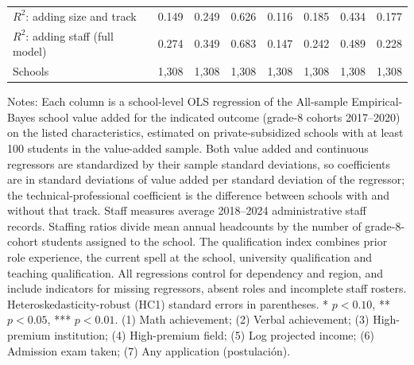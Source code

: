 \begin{table}[!htbp]
{\begin{tabular}{lccccccc}
$R^2$: adding size and track & 0.149 & 0.249 & 0.626 & 0.116 & 0.185 & 0.434 & 0.177 \\
$R^2$: adding staff (full model) & 0.274 & 0.349 & 0.683 & 0.147 & 0.242 & 0.489 & 0.228 \\
Schools & 1,308 & 1,308 & 1,308 & 1,308 & 1,308 & 1,308 & 1,308 \\
\bottomrule
\end{tabular}}
\par\medskip
\footnotesize
\begin{minipage}{\textwidth}
Notes: Each column is a school-level OLS regression of the All-sample Empirical-Bayes school value added for the indicated outcome (grade-8 cohorts 2017--2020) on the listed characteristics, estimated on private-subsidized schools with at least 100 students in the value-added sample. Both value added and continuous regressors are standardized by their sample standard deviations, so coefficients are in standard deviations of value added per standard deviation of the regressor; the technical-professional coefficient is the difference between schools with and without that track. Staff measures average 2018--2024 administrative staff records. Staffing ratios divide mean annual headcounts by the number of grade-8-cohort students assigned to the school. The qualification index combines prior role experience, the current spell at the school, university qualification and teaching qualification. All regressions control for dependency and region, and include indicators for missing regressors, absent roles and incomplete staff rosters. Heteroskedasticity-robust (HC1) standard errors in parentheses. * $p<0.10$, ** $p<0.05$, *** $p<0.01$. (1) Math achievement; (2) Verbal achievement; (3) High-premium institution; (4) High-premium field; (5) Log projected income; (6) Admission exam taken; (7) Any application (postulaci\'on).
\end{minipage}
\end{table}
